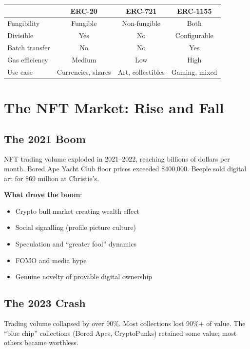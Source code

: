 \documentclass[11pt,a4paper]{article}
\begin{document}
\begin{center}
\begin{tabular}{lccc}
\toprule
& \textbf{ERC-20} & \textbf{ERC-721} & \textbf{ERC-1155} \\
\midrule
Fungibility & Fungible & Non-fungible & Both \\
Divisible & Yes & No & Configurable \\
Batch transfer & No & No & Yes \\
Gas efficiency & Medium & Low & High \\
Use case & Currencies, shares & Art, collectibles & Gaming, mixed \\
\bottomrule
\end{tabular}
\end{center}

\section{The NFT Market: Rise and Fall}

\subsection{The 2021 Boom}

NFT trading volume exploded in 2021--2022, reaching billions of dollars per month. Bored Ape Yacht Club floor prices exceeded \$400,000. Beeple sold digital art for \$69 million at Christie's.

\textbf{What drove the boom}:
\begin{itemize}
    \item Crypto bull market creating wealth effect
    \item Social signalling (profile picture culture)
    \item Speculation and ``greater fool'' dynamics
    \item FOMO and media hype
    \item Genuine novelty of provable digital ownership
\end{itemize}

\subsection{The 2023 Crash}

Trading volume collapsed by over 90\%. Most collections lost 90\%+ of value. The ``blue chip'' collections (Bored Apes, CryptoPunks) retained some value; most others became worthless.
\end{document}
